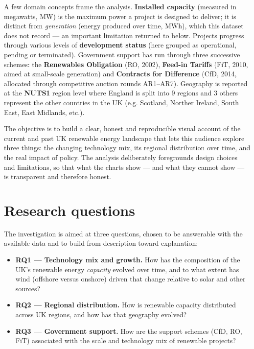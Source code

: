 \documentclass[11pt]{article}
\begin{document}
A few domain concepts frame the analysis. \textbf{Installed capacity} (measured in megawatts, MW) is the maximum power a project is designed to deliver; it is distinct from \emph{generation} (energy produced over time, MWh), which this dataset does not record --- an important limitation returned to below. Projects progress through various levels of \textbf{development status} (here grouped as operational, pending or terminated). Government support has run through three successive schemes: the \textbf{Renewables Obligation} (RO, 2002), \textbf{Feed-in Tariffs} (FiT, 2010, aimed at small-scale generation) and \textbf{Contracts for Difference} (CfD, 2014, allocated through competitive auction rounds AR1--AR7). Geography is reported at the \textbf{NUTS1} region level where England is split into 9 regions and 3 others represent the other countries in the UK (e.g. Scotland, Norther Ireland, South East, East Midlands, etc.).

The objective is to build a clear, honest and reproducible visual account of the current and past UK renewable energy landscape that lets this audience explore three things: the changing technology mix, its regional distribution over time, and the real impact of policy. The analysis deliberately foregrounds design choices and limitations, so that what the charts show --- and what they cannot show --- is transparent and therefore honest.

\section{Research questions}

The investigation is aimed at three questions, chosen to be answerable with the available data and to build from description toward explanation:

\begin{itemize}
  \item \textbf{RQ1 --- Technology mix and growth.} How has the composition of the UK's renewable energy \emph{capacity} evolved over time, and to what extent has wind (offshore versus onshore) driven that change relative to solar and other sources?
  \item \textbf{RQ2 --- Regional distribution.} How is renewable capacity distributed across UK regions, and how has that geography evolved?
  \item \textbf{RQ3 --- Government support.} How are the support schemes (CfD, RO, FiT) associated with the scale and technology mix of renewable projects?
\end{itemize}
\end{document}
